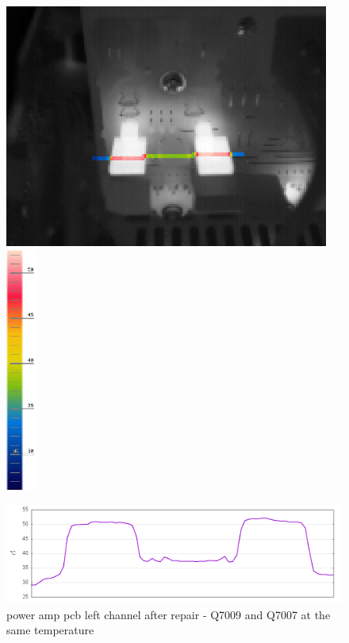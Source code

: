 \documentclass[a4paper,twoside]{report}
\begin{document}
\begin{figure}[hptb!]
 \centering
 \includegraphics[height=8cm, keepaspectratio=true]{img_report/IR_6361_hl}
 \includegraphics[height=8cm, keepaspectratio=true]{img_report/IR_6361_scale}

 \vspace*{5mm}
 \includegraphics[width=12cm, keepaspectratio=true]{img_report/IR_6361_hl_gnuplot}

 \caption{power amp pcb left channel after repair - Q7009 and Q7007 at the same temperature}
\end{figure}
\end{document}
